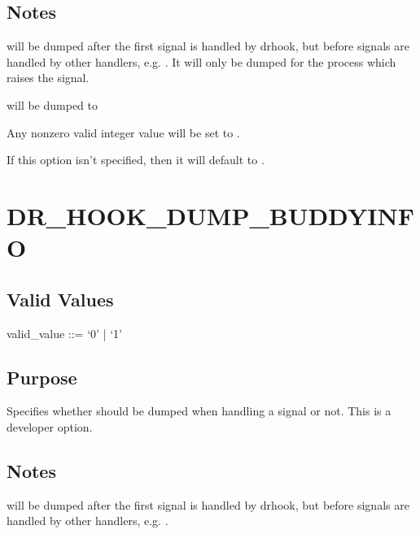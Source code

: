 \documentclass[letterpaper,10pt,english]{sphinxmanual}
\begin{document}
\subsection{Notes}
\label{\detokenize{flag/flag:id193}}
\sphinxAtStartPar
{} will be dumped after the first signal is handled by drhook, but before signals are handled by other handlers, e.g. . It will only be dumped for the process which raises the signal.

\sphinxAtStartPar
{} will be dumped to 

\sphinxAtStartPar
Any non\sphinxhyphen{}zero valid integer value will be set to .

\sphinxAtStartPar
If this option isn’t specified, then it will default to .


\section{DR\_HOOK\_DUMP\_BUDDYINFO}
\label{\detokenize{flag/flag:dr-hook-dump-buddyinfo}}\label{\detokenize{flag/flag:id196}}

\subsection{Valid Values}
\label{\detokenize{flag/flag:id197}}
\begin{DUlineblock}{0em}
\item[] valid\_value ::= ‘0’ | ‘1’
\end{DUlineblock}


\subsection{Purpose}
\label{\detokenize{flag/flag:id198}}
\sphinxAtStartPar
Specifies whether  should be dumped when handling a signal or not. This is a developer option.


\subsection{Notes}
\label{\detokenize{flag/flag:id199}}
\sphinxAtStartPar
{} will be dumped after the first signal is handled by drhook, but before signals are handled by other handlers, e.g. .
\end{document}
